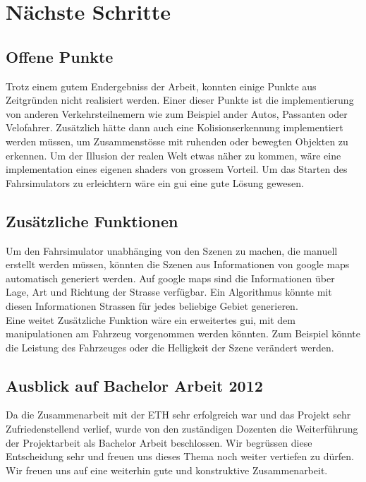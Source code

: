 \section{Nächste Schritte}
\subsection{Offene Punkte}
Trotz einem gutem Endergebniss der Arbeit, konnten einige Punkte aus Zeitgründen nicht realisiert werden. Einer dieser Punkte ist die implementierung von anderen Verkehrsteilnemern wie zum Beispiel ander Autos, Passanten oder Velofahrer. Zusätzlich hätte dann auch eine Kolisionserkennung implementiert werden müssen, um Zusammenstösse mit ruhenden oder bewegten Objekten zu erkennen. Um der Illusion der realen Welt etwas näher zu kommen, wäre eine implementation eines eigenen \glspl{shader} von grossem Vorteil. Um das Starten des Fahrsimulators zu erleichtern wäre ein \gls{gui} eine gute Lösung gewesen. 
\subsection{Zusätzliche Funktionen}
Um den Fahrsimulator unabhänging von den Szenen zu machen, die manuell erstellt werden müssen, könnten die Szenen aus Informationen von google maps automatisch generiert werden. Auf google maps sind die Informationen über Lage, Art und Richtung der Strasse verfügbar. Ein Algorithmus könnte mit diesen Informationen Strassen für jedes beliebige Gebiet generieren. \\
Eine weitet Zusätzliche Funktion wäre ein erweitertes \gls{gui}, mit dem manipulationen am Fahrzeug vorgenommen werden könnten. Zum Beispiel könnte die Leistung des Fahrzeuges oder die Helligkeit der Szene verändert werden. 
\subsection{Ausblick auf Bachelor Arbeit 2012}
Da die Zusammenarbeit mit der ETH sehr erfolgreich war und das Projekt sehr Zufriedenstellend verlief, wurde von den zuständigen Dozenten die Weiterführung der Projektarbeit als Bachelor Arbeit beschlossen. Wir begrüssen diese Entscheidung sehr und freuen uns dieses Thema noch weiter vertiefen zu dürfen. Wir freuen uns auf eine weiterhin gute und konstruktive Zusammenarbeit. 